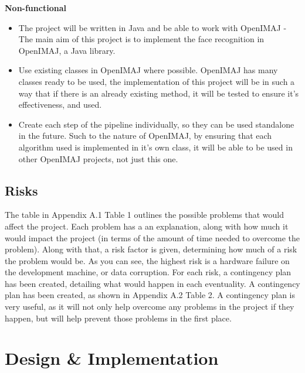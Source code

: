 \documentclass[12pt, a4paper]{article}
\begin{document}
\textbf{Non-functional}
\begin{itemize}
\item The project will be written in Java and be able to work with OpenIMAJ - The main aim of this project is to implement the face recognition in OpenIMAJ, a Java library.
\item Use existing classes in OpenIMAJ where possible. OpenIMAJ has many classes ready to be used, the implementation of this project will be in such a way that if there is an already existing method, it will be tested to ensure it’s effectiveness, and used.
\item Create each step of the pipeline individually, so they can be used standalone in the future. Such to the nature of OpenIMAJ, by ensuring that each algorithm used is implemented in it’s own class, it will be able to be used in other OpenIMAJ projects, not just this one. 
\end{itemize}
\subsection{Risks}
The table in Appendix A.1 Table 1 outlines the possible problems that would affect the project. Each problem has a an explanation, along with how much it would impact the project (in terms of the amount of time needed to overcome the problem). Along with that, a risk factor is given, determining how much of a risk the problem would be. As you can see, the highest risk is a hardware failure on the development machine, or data corruption. For each risk, a contingency plan has been created, detailing what would happen in each eventuality. A contingency plan has been created, as shown in Appendix A.2 Table 2. A contingency plan is very useful, as it will not only help overcome any problems in the project if they happen, but will help prevent those problems in the first place. 

\section{Design \& Implementation}
\end{document}
